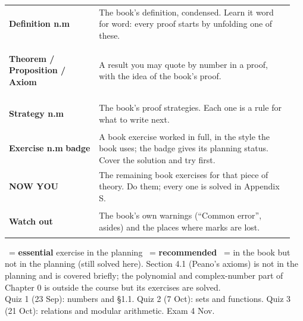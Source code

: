 \begin{center}\sffamily\small
\begin{tabular}{@{}p{0.30\linewidth}p{0.65\linewidth}@{}}
\colorbox{hyellow}{\strut\textbf{Definition n.m}} & The book's definition, condensed. Learn it word for word: every proof starts by unfolding one of these.\\[3pt]
\colorbox{hlight}{\strut\textbf{Theorem / Proposition / Axiom}} & A result you may quote by number in a proof, with the idea of the book's proof.\\[3pt]
\colorbox{hgreen}{\strut\textbf{Strategy n.m}} & The book's proof strategies. Each one is a rule for what to write next.\\[3pt]
\colorbox{white}{\strut\textcolor{hblue}{\textbf{Exercise n.m}} \textcolor{horange}{\small\textbf{badge}}} & A book exercise worked in full, in the style the book uses; the badge gives its planning status. Cover the solution and try first.\\[3pt]
\colorbox{hpurplebg}{\strut\textbf{NOW YOU}} & The remaining book exercises for that piece of theory. Do them; every one is solved in Appendix S.\\[3pt]
\colorbox{hredbg}{\strut\textbf{Watch out}} & The book's own warnings (``Common error'', asides) and the places where marks are lost.
\end{tabular}
\end{center}

\begin{key}
\fE\ = \textbf{essential} exercise in the planning \quad \fR\ = \textbf{recommended} \quad \fO\ = in the book but not in the planning (still solved here). Section 4.1 (Peano's axioms) is not in the planning and is covered briefly; the polynomial and complex-number part of Chapter 0 is outside the course but its exercises are solved.\\[3pt]
Quiz 1 (23 Sep): numbers and \S1.1. \quad Quiz 2 (7 Oct): sets and functions. \quad Quiz 3 (21 Oct): relations and modular arithmetic. \quad Exam 4 Nov.
\end{key}

